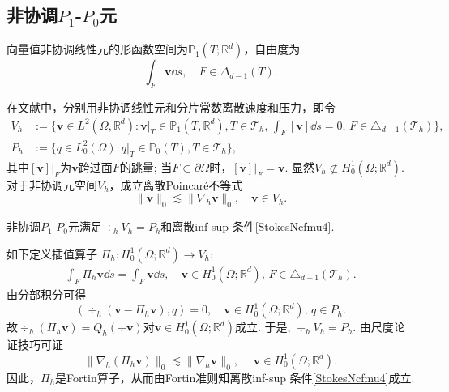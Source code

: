 \subsection{非协调$P_1$-$P_0$元}

向量值非协调线性元的形函数空间为$\mathbb P_1(T;\mathbb R^d)$，自由度为
\begin{equation*}
\int_F\boldsymbol{v}\dd s, \quad F\in\Delta_{d-1}(T).
\end{equation*}

在文献\cite{CrouzeixRaviart1973}中，分别用非协调线性元和分片常数离散速度和压力，即令
\begin{align*}
 V_{h}
&:=\big\{\boldsymbol{v}\in L^{2}(\Omega,\mathbb{R}^{d}):
\boldsymbol{v}|_T\in \mathbb P_1(T,\mathbb{R}^{d}), T\in \mathcal{T}_h,\,\int_{F}[\boldsymbol{v}]\dd s=0,\,F\in \triangle_{d-1}(\mathcal{T}_h)\big\},
\\
P_{h}&:=\{q\in L_0^2(\Omega): q|_T\in \mathbb P_0(T), T\in \mathcal{T}_h\},
\end{align*}
其中$[\boldsymbol{v}]|_F$为$\boldsymbol{v}$跨过面$F$的跳量; 当$F\subset\partial\Omega$时，$[\boldsymbol{v}]|_F=\boldsymbol{v}$. 显然$ V_h  \not\subset H_0^{1}(\Omega; \mathbb{R}^{d})$. 对于非协调元空间$V_h$，成立离散Poincar\'e不等式 \cite{Brenner2003}
\begin{equation*}
\|\boldsymbol{v}\|_0\lesssim \|\nabla_h\boldsymbol{v}\|_0,\quad\boldsymbol{v}\in V_h.
\end{equation*}


\begin{lemma}
非协调$P_1$-$P_0$元满足$\div_hV_h=P_h$和离散inf-sup 条件\eqref{StokesNcfmu4}.
\end{lemma}
\begin{prf}
如下定义插值算子
$\Pi_{h}:H_0^{1}(\Omega; \mathbb{R}^{d})\to  V_{h}$:
\begin{align}\label{qi1}
\int_{F}\Pi_{h}\boldsymbol{v}\dd s=\int_{F} \boldsymbol{v}\dd s,
\quad \boldsymbol{v}\in H_0^{1}(\Omega; \mathbb{R}^{d}),\,F\in\triangle_{d-1}(\mathcal{T}_h).
\end{align}
由分部积分可得
\begin{equation*}
(\div_h(\boldsymbol{v}-\Pi_h\boldsymbol{v}), q) =0,\quad  \boldsymbol{v}\in H_0^{1}(\Omega; \mathbb{R}^{d}), \, q\in P_{h}.	
\end{equation*}
故$\div_h(\Pi_h\boldsymbol{v})=Q_h(\div\boldsymbol{v})$对$\boldsymbol{v}\in H_0^{1}(\Omega; \mathbb{R}^{d})$成立. 于是, $\div_hV_h=P_h$.
由尺度论证技巧可证
\begin{equation*}
\|\nabla_h(\Pi_h\boldsymbol{v})\|_{0} \lesssim\|\nabla_h\boldsymbol{v}\|_{0}, \quad\;  \boldsymbol{v}\in H_0^{1}(\Omega; \mathbb{R}^{d}).
\end{equation*}
因此，$\Pi_{h}$是Fortin算子，从而由Fortin准则知离散inf-sup 条件\eqref{StokesNcfmu4}成立.
\end{prf}

